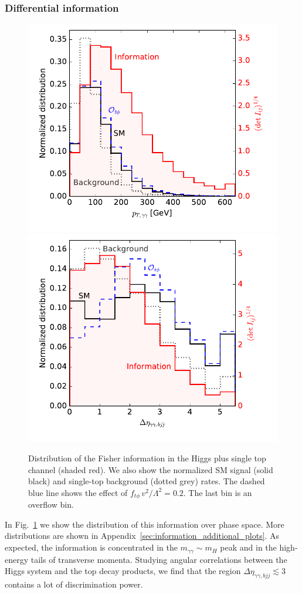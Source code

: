 \subsubsection*{Differential information}

\begin{figure}
  \includegraphics[height=0.45 \textwidth]{fig/information/th_information_over_ptaa}%
  \includegraphics[height=0.45 \textwidth]{fig/information/th_information_over_deltaeta}%
  \caption{Distribution of the Fisher information in the Higgs plus
    single top channel (shaded red). We also show the normalized SM
    signal (solid black) and single-top background (dotted grey)
    rates. The dashed blue line shows the effect of
    $f_{t \phi} \, v^2 / \Lambda^2 = 0.2$. The last bin is an overflow
    bin.}
  \label{fig:information_th_differential_information}
\end{figure}

In Fig.~\ref{fig:information_th_differential_information} we show the distribution
of this information over phase space. More distributions are shown in
Appendix~\ref{sec:information_additional_plots}. As expected, the information is
concentrated in the $m_{\gamma \gamma} \sim m_H$ peak and in the
high-energy tails of transverse momenta. Studying angular correlations
between the Higgs system and the top decay products, we find that the
region $\Delta \eta_{ \gamma \gamma, bjj} \lesssim 3$ contains a lot
of discrimination power.




